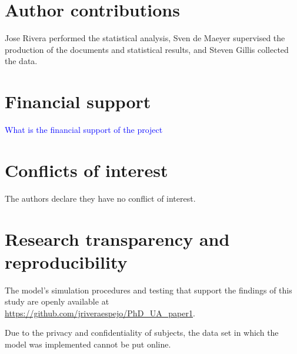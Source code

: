 \section{Author contributions}
Jose Rivera performed the statistical analysis, Sven de Maeyer supervised the production of the documents and statistical results, and Steven Gillis collected the data.
%
%
\section{Financial support}
\textcolor{blue}{What is the financial support of the project}
%
%
\section{Conflicts of interest}
The authors declare they have no conflict of interest.
%
%
\section{Research transparency and reproducibility}
The model's simulation procedures and testing that support the findings of this study are openly available at \url{https://github.com/jriveraespejo/PhD_UA_paper1}.

Due to the privacy and confidentiality of subjects, the data set in which the model was implemented cannot be put online.
%
%